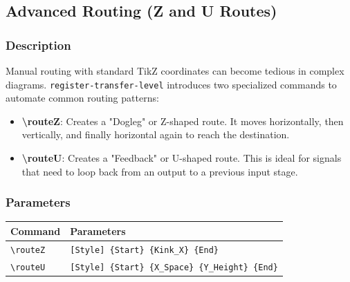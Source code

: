 \subsection{\sffamily Advanced Routing (Z and U Routes)}

    \subsubsection{\sffamily Description}
        Manual routing with standard TikZ coordinates can become tedious in complex diagrams. \texttt{register-transfer-level} introduces two specialized commands to automate common routing patterns:
        
        \begin{itemize}
            \item \textbf{\textbackslash routeZ}: Creates a "Dogleg" or Z-shaped route. It moves horizontally, then vertically, and finally horizontal again to reach the destination.
            \item \textbf{\textbackslash routeU}: Creates a "Feedback" or U-shaped route. This is ideal for signals that need to loop back from an output to a previous input stage.
        \end{itemize}

    \subsubsection{\sffamily Parameters}
    \begin{center}
        \begin{tabular}{lp{8cm}}
        \toprule
            \textbf{Command} & \textbf{Parameters} \\
            \midrule
            \texttt{\textbackslash routeZ} & \texttt{[Style] \{Start\} \{Kink\_X\} \{End\}} \\
            \texttt{\textbackslash routeU} & \texttt{[Style] \{Start\} \{X\_Space\} \{Y\_Height\} \{End\}} \\
            \bottomrule
        \end{tabular}
    \end{center}

